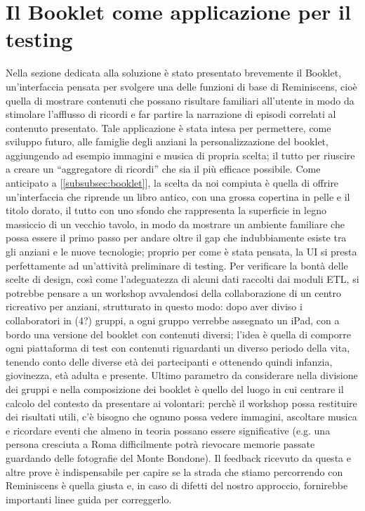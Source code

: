\documentclass{acm_proc_article-sp}
\begin{document}
\section{Il Booklet come applicazione per il testing}
Nella sezione dedicata alla soluzione è stato presentato brevemente il Booklet, un’interfaccia pensata per svolgere una delle funzioni di base di Reminiscens, cioè quella di mostrare contenuti che possano risultare familiari all’utente in modo da stimolare l’afflusso di ricordi e far partire la narrazione di episodi correlati al contenuto presentato. Tale applicazione è stata intesa per permettere, come sviluppo futuro, alle famiglie degli anziani la personalizzazione del booklet, aggiungendo ad esempio immagini e musica di propria scelta; il tutto per riuscire a creare un “aggregatore di ricordi” che sia il più efficace possibile. Come anticipato a [\ref{subsubsec:booklet}], la scelta da noi compiuta è quella di offrire un’interfaccia che riprende un libro antico, con una grossa copertina in pelle e il titolo dorato, il tutto con uno sfondo che rappresenta la superficie in legno massiccio di un vecchio tavolo, in modo da mostrare un ambiente familiare che possa essere il primo passo per andare oltre il gap che indubbiamente esiste tra gli anziani e le nuove tecnologie; proprio per come è stata pensata, la UI si presta perfettamente ad un’attività preliminare di testing. Per verificare la bontà delle scelte di design, così come l’adeguatezza di alcuni dati raccolti dai moduli ETL, si potrebbe pensare a un workshop avvalendosi della collaborazione di un centro ricreativo per anziani, strutturato in questo modo: dopo aver diviso i collaboratori in (4?) gruppi, a ogni gruppo verrebbe assegnato un iPad, con a bordo una versione del booklet con contenuti diversi; l’idea è quella di comporre ogni piattaforma di test con contenuti riguardanti un diverso periodo della vita, tenendo conto delle diverse età dei partecipanti e ottenendo quindi infanzia, giovinezza, età adulta e presente. Ultimo parametro da considerare nella divisione dei gruppi e nella composizione dei booklet è quello del luogo in cui centrare il calcolo del contesto da presentare ai volontari: perchè il workshop possa restituire dei risultati utili, c’è bisogno che ognuno possa vedere immagini, ascoltare musica e ricordare eventi che almeno in teoria possano essere significative (e.g. una persona cresciuta a Roma difficilmente potrà rievocare memorie passate guardando delle fotografie del Monte Bondone). Il feedback ricevuto da questa e altre prove è indispensabile per capire se la strada che stiamo percorrendo con Reminiscens è quella giusta e, in caso di difetti del nostro approccio, fornirebbe importanti linee guida per correggerlo.
\end{document}
